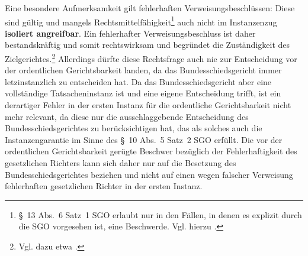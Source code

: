 Eine besondere Aufmerksamkeit gilt fehlerhaften Verweisungsbeschlüssen:
Diese sind gültig und mangels Rechtsmittelfähigkeit\footnote{\S~13 Abs.~6 Satz~1 SGO erlaubt nur in den Fällen, in denen es explizit durch die SGO vorgesehen ist, eine Beschwerde. Vgl. hierzu \cites{BSG201305151}{BSG201306071}.}  auch nicht im Instanzenzug \textbf{isoliert angreifbar}.
Ein fehlerhafter Verweisungsbeschluss ist daher bestandskräftig und somit rechtswirksam und begründet die Zuständigkeit des Zielgerichtes.\footnote{Vgl. dazu etwa \cite[5]{LSGBB147}.}
Allerdings dürfte diese Rechtsfrage auch nie zur Entscheidung vor der ordentlichen Gerichtsbarkeit landen, da das Bundesschiedsgericht immer letzinstanzlich zu entscheiden hat.
Da das Bundesschiedsgericht aber eine vollständige Tatsacheninstanz ist und eine eigene Entscheidung trifft, ist ein derartiger Fehler in der ersten Instanz für die ordentliche Gerichtsbarkeit nicht mehr relevant, da diese nur die ausschlaggebende Entscheidung des Bundesschiedsgerichtes zu berücksichtigen hat, das als solches auch die Instanzengarantie im Sinne des \S~10 Abs.~5 Satz~2 SGO erfüllt.
Die vor der ordentlichen Gerichtsbarkeit gerügte Beschwer bezüglich der Fehlerhaftigkeit des gesetzlichen Richters kann sich daher nur auf die Besetzung des Bundesschiedsgerichtes beziehen und nicht auf einen wegen falscher Verweisung fehlerhaften gesetzlichen Richter in der ersten Instanz.


\chapterbib

